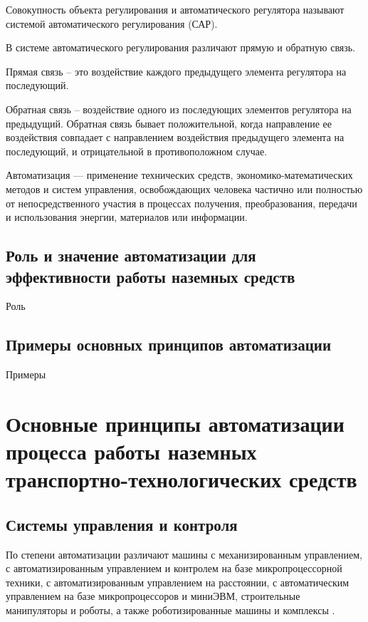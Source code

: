 Совокупность объекта регулирования и автоматического регулятора называют системой автоматического регулирования (САР).

В системе автоматического регулирования различают прямую и обратную связь.

Прямая связь -- это воздействие каждого предыдущего элемента регулятора на последующий.

Обратная связь -- воздействие одного из последующих элементов регулятора на предыдущий. Обратная связь бывает положительной, когда направление ее воздействия совпадает с направлением воздействия предыдущего элемента на последующий, и отрицательной в противоположном случае.

Автоматизация — применение технических средств, экономико-математических методов и систем управления, освобождающих человека частично или полностью от непосредственного участия в процессах получения, преобразования, передачи и использования энергии, материалов или информации.

\subsection{Роль и значение автоматизации для эффективности работы наземных средств}\label{subsec:ch1/sec1/sub2}

Роль

\subsection{Примеры основных принципов автоматизации}\label{subsec:ch1/sec1/sub3}

Примеры

\section{Основные принципы автоматизации процесса работы наземных транспортно-технологических средств}\label{sec:ch1/sec2}

\subsection{Системы управления и контроля}\label{subsec:ch1/sec2/sub1}

По степени автоматизации различают машины с механизированным управлением, с автоматизированным управлением и контролем на базе микропроцессорной техники, с автоматизированным управлением на расстоянии, с автоматическим управлением на базе микропроцессоров и миниЭВМ, строительные манипуляторы и роботы, а также роботизированные машины и комплексы \cite[с.~39]{Evtukov}.

